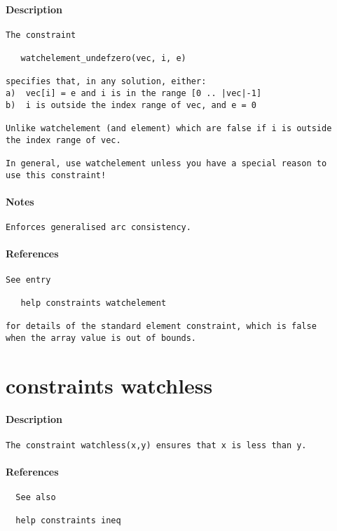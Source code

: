 \paragraph{Description}
{\footnotesize
\begin{verbatim}
The constraint

   watchelement_undefzero(vec, i, e)

specifies that, in any solution, either:
a)  vec[i] = e and i is in the range [0 .. |vec|-1]
b)  i is outside the index range of vec, and e = 0

Unlike watchelement (and element) which are false if i is outside
the index range of vec.

In general, use watchelement unless you have a special reason to
use this constraint!
\end{verbatim}
}
\paragraph{Notes}
{\footnotesize
\begin{verbatim}
Enforces generalised arc consistency.
\end{verbatim}
}
\paragraph{References}
{\footnotesize
\begin{verbatim}
See entry

   help constraints watchelement

for details of the standard element constraint, which is false
when the array value is out of bounds.
\end{verbatim}
}
\section{constraints watchless}
\paragraph{Description}
{\footnotesize
\begin{verbatim}
The constraint watchless(x,y) ensures that x is less than y.
\end{verbatim}
}
\paragraph{References}
{\footnotesize
\begin{verbatim}
  See also

  help constraints ineq
\end{verbatim}
}
